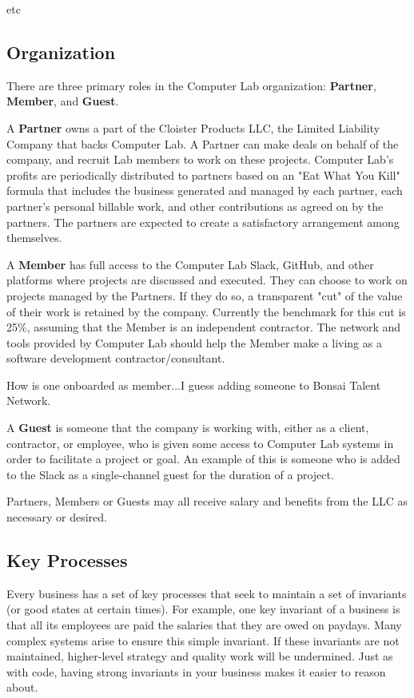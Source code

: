 \documentclass[12pt]{article}
\begin{document}
etc

\subsection{Organization}

There are three primary roles in the Computer Lab organization: \textbf{Partner},
\textbf{Member}, and \textbf{Guest}.

A \textbf{Partner} owns a part of the Cloister Products LLC, the Limited Liability
Company that backs Computer Lab.  A Partner can make deals on behalf of the
company, and recruit Lab members to work on these projects.  Computer Lab's
profits are periodically distributed to partners based on an "Eat What You Kill"
formula that includes the business generated and managed by each partner, each
partner's personal billable work, and other contributions as agreed on by the
partners.  The partners are expected to create a satisfactory arrangement among
themselves.

A \textbf{Member} has full access to the Computer Lab Slack, GitHub, and other
platforms where projects are discussed and executed.  They can choose to work on
projects managed by the Partners.  If they do so, a transparent "cut" of the
value of their work is retained by the company.  Currently the benchmark for
this cut is 25\%, assuming that the Member is an independent contractor.  The
network and tools provided by Computer Lab should help the Member make a living
as a software development contractor/consultant.

How is one onboarded as member...I guess adding someone to Bonsai Talent
Network.

A \textbf{Guest} is someone that the company is working with, either as a client,
contractor, or employee, who is given some access to Computer Lab systems in
order to facilitate a project or goal.  An example of this is someone who is
added to the Slack as a single-channel guest for the duration of a project.

Partners, Members or Guests may all receive salary and benefits from
the LLC as necessary or desired.

\subsection{Key Processes}
Every business has a set of key processes that seek to maintain a set of
invariants (or good states at certain times). For example, one key invariant of
a business is that all its employees are paid the salaries that they are owed
on paydays. Many complex systems arise to ensure this simple invariant.
If these invariants are not maintained, higher-level strategy and quality work
will be undermined. Just as with code, having strong invariants in your business
makes it easier to reason about.
\end{document}
